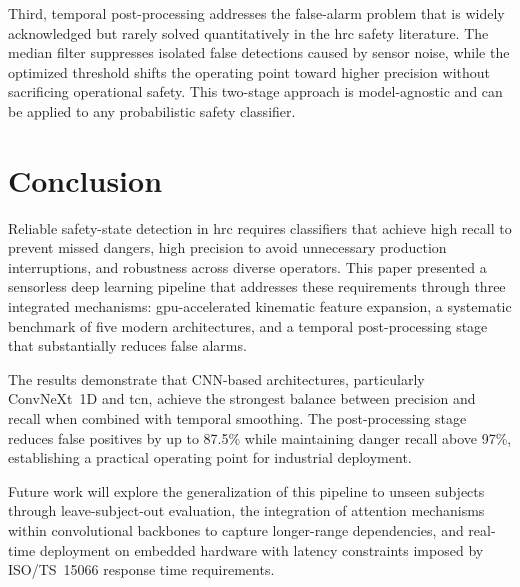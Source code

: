 \documentclass[3p,times,procedia]{elsarticle}
\begin{document}
Third, temporal post-processing addresses the false-alarm problem that is widely acknowledged but rarely solved quantitatively in the \ac{hrc} safety literature. The median filter suppresses isolated false detections caused by sensor noise, while the optimized threshold shifts the operating point toward higher precision without sacrificing operational safety. This two-stage approach is model-agnostic and can be applied to any probabilistic safety classifier.

\section{Conclusion}
\label{sec:conclusion}

Reliable safety-state detection in \ac{hrc} requires classifiers that achieve high recall to prevent missed dangers, high precision to avoid unnecessary production interruptions, and robustness across diverse operators. This paper presented a sensorless deep learning pipeline that addresses these requirements through three integrated mechanisms: \ac{gpu}-accelerated kinematic feature expansion, a systematic benchmark of five modern architectures, and a temporal post-processing stage that substantially reduces false alarms.

The results demonstrate that CNN-based architectures, particularly ConvNeXt~1D and \ac{tcn}, achieve the strongest balance between precision and recall when combined with temporal smoothing. The post-processing stage reduces false positives by up to 87.5\% while maintaining danger recall above 97\%, establishing a practical operating point for industrial deployment.

Future work will explore the generalization of this pipeline to unseen subjects through leave-subject-out evaluation, the integration of attention mechanisms within convolutional backbones to capture longer-range dependencies, and real-time deployment on embedded hardware with latency constraints imposed by ISO/TS~15066 response time requirements.

\newpage


\end{document}
